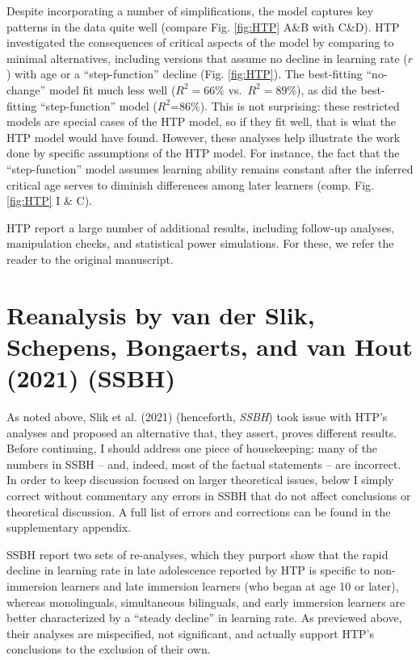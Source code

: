 \documentclass[
  english,
  doc,floatsintext]{apa6}
\begin{document}
Despite incorporating a number of simplifications, the model captures key patterns in the data quite well (compare Fig. \ref{fig:HTP} A\&B with C\&D). HTP investigated the consequences of critical aspects of the model by comparing to minimal alternatives, including versions that assume no decline in learning rate (\(r\)) with age or a ``step-function'' decline (Fig. \ref{fig:HTP}). The best-fitting ``no-change'' model fit much less well (\(R^2=66\)\% vs.~\(R^2=89\)\%), as did the best-fitting ``step-function'' model (\(R^2\)=86\%). This is not surprising: these restricted models are special cases of the HTP model, so if they fit well, that is what the HTP model would have found. However, these analyses help illustrate the work done by specific assumptions of the HTP model. For instance, the fact that the ``step-function'' model assumes learning ability remains constant after the inferred critical age serves to diminish differences among later learners (comp. Fig. \ref{fig:HTP} I \& C).

HTP report a large number of additional results, including follow-up analyses, manipulation checks, and statistical power simulations. For these, we refer the reader to the original manuscript.

\hypertarget{reanalysis-by-van-der-slik-schepens-bongaerts-and-van-hout-2021-ssbh}{%
\section{Reanalysis by van der Slik, Schepens, Bongaerts, and van Hout (2021) (SSBH)}\label{reanalysis-by-van-der-slik-schepens-bongaerts-and-van-hout-2021-ssbh}}

As noted above, Slik et al. (2021) (henceforth, \emph{SSBH}) took issue with HTP's analyses and proposed an alternative that, they assert, proves different results. Before continuing, I should address one piece of housekeeping: many of the numbers in SSBH -- and, indeed, most of the factual statements -- are incorrect. In order to keep discussion focused on larger theoretical issues, below I simply correct without commentary any errors in SSBH that do not affect conclusions or theoretical discussion. A full list of errors and corrections can be found in the supplementary appendix.

SSBH report two sets of re-analyses, which they purport show that the rapid decline in learning rate in late adolescence reported by HTP is specific to non-immersion learners and late immersion learners (who began at age 10 or later), whereas monolinguals, simultaneous bilinguals, and early immersion learners are better characterized by a ``steady decline'' in learning rate. As previewed above, their analyses are mispecified, not significant, and actually support HTP's conclusions to the exclusion of their own.
\end{document}
